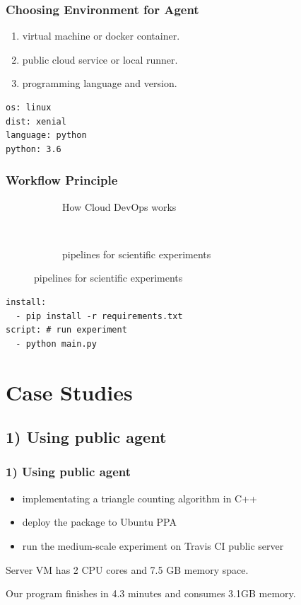 \documentclass[notheorems]{beamer}
\begin{document}
\begin{frame}[fragile]
\frametitle{Choosing Environment for Agent}
\begin{enumerate}
\item virtual machine or docker container.
\item public cloud service or local runner.
\item programming language and version.
\end{enumerate}

\begin{lstlisting}[caption={environment configuration}, captionpos=b, xleftmargin=.3\textwidth]
os: linux
dist: xenial
language: python
python: 3.6
\end{lstlisting}
\end{frame}

\begin{frame}[fragile]
\frametitle{Workflow Principle}
\begin{figure}
\centering
\begin{subfigure}{0.4\textwidth}
\caption{How Cloud DevOps works}
\end{subfigure}~
\begin{subfigure}{0.4\textwidth}
\caption{pipelines for scientific experiments}
\end{subfigure}
\end{figure}

\begin{lstlisting}[caption={workflow description}, label={lst:wd}, captionpos=b, xleftmargin=.25\textwidth]
install: 
  - pip install -r requirements.txt
script: # run experiment
  - python main.py
\end{lstlisting}

\end{frame}
\section{Case Studies}
\frame{\tableofcontents[currentsection]}
\subsection{1) Using public agent}
\begin{frame}
\frametitle{1) Using public agent}
\begin{itemize}
\item implementating a triangle counting algorithm in C++
\item deploy the package to Ubuntu PPA
\item run the medium-scale experiment on Travis CI public server
\end{itemize}
Server VM has 2 CPU cores and 7.5 GB memory space.

Our program finishes in 4.3 minutes and consumes 3.1GB memory.
\end{frame}
\end{document}

